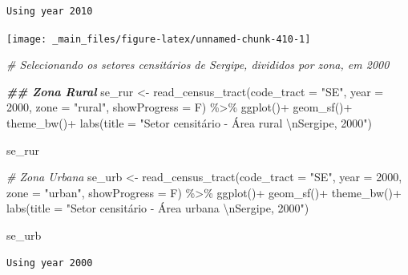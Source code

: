 \documentclass[
  brazilian,
]{book}
\newenvironment{Shaded}{\begin{snugshade}}{\end{snugshade}}
\newcommand{\AttributeTok}[1]{\textcolor[rgb]{0.77,0.63,0.00}{#1}}
\newcommand{\CommentTok}[1]{\textcolor[rgb]{0.56,0.35,0.01}{\textit{#1}}}
\newcommand{\DecValTok}[1]{\textcolor[rgb]{0.00,0.00,0.81}{#1}}
\newcommand{\DocumentationTok}[1]{\textcolor[rgb]{0.56,0.35,0.01}{\textbf{\textit{#1}}}}
\newcommand{\FunctionTok}[1]{\textcolor[rgb]{0.00,0.00,0.00}{#1}}
\newcommand{\NormalTok}[1]{#1}
\newcommand{\OtherTok}[1]{\textcolor[rgb]{0.56,0.35,0.01}{#1}}
\newcommand{\SpecialCharTok}[1]{\textcolor[rgb]{0.00,0.00,0.00}{#1}}
\newcommand{\StringTok}[1]{\textcolor[rgb]{0.31,0.60,0.02}{#1}}
\begin{document}
\begin{verbatim}
Using year 2010
\end{verbatim}

\begin{center}\texttt{[image: \_main\_files/figure-latex/unnamed-chunk-410-1]} \end{center}

\begin{Shaded}
\begin{Highlighting}[]
\CommentTok{\# Selecionando os setores censitários de Sergipe, divididos por zona, em 2000}

\DocumentationTok{\#\# Zona Rural}
\NormalTok{se\_rur }\OtherTok{\textless{}{-}} \FunctionTok{read\_census\_tract}\NormalTok{(}\AttributeTok{code\_tract =} \StringTok{"SE"}\NormalTok{,}
                            \AttributeTok{year =} \DecValTok{2000}\NormalTok{,}
                            \AttributeTok{zone =} \StringTok{"rural"}\NormalTok{,}
                            \AttributeTok{showProgress =}\NormalTok{ F) }\SpecialCharTok{\%\textgreater{}\%}
  \FunctionTok{ggplot}\NormalTok{()}\SpecialCharTok{+}
  \FunctionTok{geom\_sf}\NormalTok{()}\SpecialCharTok{+}
  \FunctionTok{theme\_bw}\NormalTok{()}\SpecialCharTok{+}
  \FunctionTok{labs}\NormalTok{(}\AttributeTok{title =} \StringTok{"Setor censitário {-} Área rural }\SpecialCharTok{\textbackslash{}n}\StringTok{Sergipe, 2000"}\NormalTok{)}

\NormalTok{se\_rur}


\CommentTok{\# Zona Urbana}
\NormalTok{se\_urb }\OtherTok{\textless{}{-}} \FunctionTok{read\_census\_tract}\NormalTok{(}\AttributeTok{code\_tract =} \StringTok{"SE"}\NormalTok{,}
                            \AttributeTok{year =} \DecValTok{2000}\NormalTok{,}
                            \AttributeTok{zone =} \StringTok{"urban"}\NormalTok{,}
                            \AttributeTok{showProgress =}\NormalTok{ F) }\SpecialCharTok{\%\textgreater{}\%}
  \FunctionTok{ggplot}\NormalTok{()}\SpecialCharTok{+}
  \FunctionTok{geom\_sf}\NormalTok{()}\SpecialCharTok{+}
  \FunctionTok{theme\_bw}\NormalTok{()}\SpecialCharTok{+}
  \FunctionTok{labs}\NormalTok{(}\AttributeTok{title =} \StringTok{"Setor censitário {-} Área urbana }\SpecialCharTok{\textbackslash{}n}\StringTok{Sergipe, 2000"}\NormalTok{)}

\NormalTok{se\_urb}
\end{Highlighting}
\end{Shaded}

\begin{verbatim}
Using year 2000
\end{verbatim}
\end{document}
